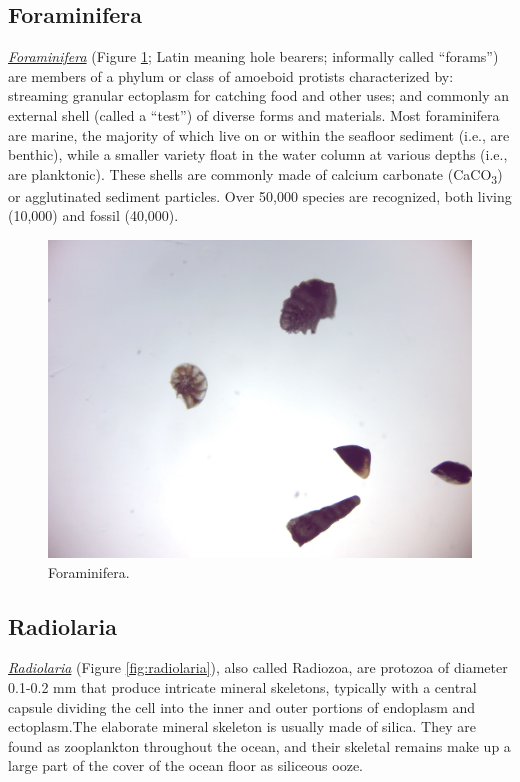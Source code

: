 \subsection{Foraminifera}\label{foraminifera}

\href{https://en.wikipedia.org/wiki/Foraminifera}{\emph{Foraminifera}}
(Figure \ref{fig:foraminifera}; Latin meaning hole bearers; informally
called ``forams'') are members of a phylum or class of amoeboid protists
characterized by: streaming granular ectoplasm for catching food and
other uses; and commonly an external shell (called a ``test'') of
diverse forms and materials. Most foraminifera are marine, the majority
of which live on or within the seafloor sediment (i.e., are benthic),
while a smaller variety float in the water column at various depths
(i.e., are planktonic). These shells are commonly made of calcium
carbonate (CaCO\textsubscript{3}) or agglutinated sediment particles.
Over 50,000 species are recognized, both living (10,000) and fossil
(40,000).

\begin{figure}

{\centering \includegraphics[width=0.7\linewidth]{./figures/protists/foraminifera} 

}

\caption{Foraminifera.}\label{fig:foraminifera}
\end{figure}

\subsection{Radiolaria}\label{radiolaria}

\href{https://en.wikipedia.org/wiki/Radiolaria}{\emph{Radiolaria}}
(Figure \ref{fig:radiolaria}), also called Radiozoa, are protozoa of
diameter 0.1-0.2 mm that produce intricate mineral skeletons, typically
with a central capsule dividing the cell into the inner and outer
portions of endoplasm and ectoplasm.The elaborate mineral skeleton is
usually made of silica. They are found as zooplankton throughout the
ocean, and their skeletal remains make up a large part of the cover of
the ocean floor as siliceous ooze.

